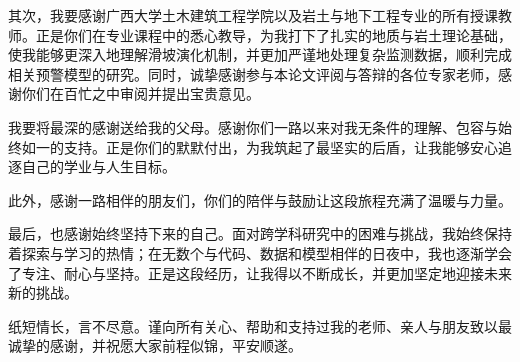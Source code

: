 \documentclass[12pt,a4paper]{article}
\begin{document}
其次，我要感谢广西大学土木建筑工程学院以及岩土与地下工程专业的所有授课教师。正是你们在专业课程中的悉心教导，为我打下了扎实的地质与岩土理论基础，使我能够更深入地理解滑坡演化机制，并更加严谨地处理复杂监测数据，顺利完成相关预警模型的研究。同时，诚挚感谢参与本论文评阅与答辩的各位专家老师，感谢你们在百忙之中审阅并提出宝贵意见。

我要将最深的感谢送给我的父母。感谢你们一路以来对我无条件的理解、包容与始终如一的支持。正是你们的默默付出，为我筑起了最坚实的后盾，让我能够安心追逐自己的学业与人生目标。

此外，感谢一路相伴的朋友们，你们的陪伴与鼓励让这段旅程充满了温暖与力量。

最后，也感谢始终坚持下来的自己。面对跨学科研究中的困难与挑战，我始终保持着探索与学习的热情；在无数个与代码、数据和模型相伴的日夜中，我也逐渐学会了专注、耐心与坚持。正是这段经历，让我得以不断成长，并更加坚定地迎接未来新的挑战。

纸短情长，言不尽意。谨向所有关心、帮助和支持过我的老师、亲人与朋友致以最诚挚的感谢，并祝愿大家前程似锦，平安顺遂。


\end{document}
